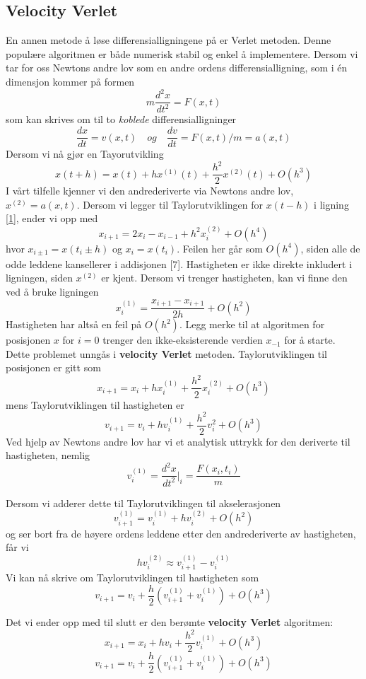 \documentclass[11pt,a4paper]{article}
\begin{document}
\subsection{Velocity Verlet}
En annen metode å løse differensialligningene på er Verlet metoden. Denne populære algoritmen er både numerisk stabil og enkel å implementere. Dersom vi tar for oss Newtons andre lov som en andre ordens differensialligning, som i én dimensjon kommer på formen
\[ m \frac{d^2x}{dt^2} = F(x,t) \]
som kan skrives om til to \textit{koblede} differensialligninger
\[\frac{dx}{dt} = v(x,t) \quad og \quad \frac{dv}{dt} = F(x,t)/m = a(x,t) \]
Dersom vi nå gjør en Tayorutvikling
\begin{equation}
x(t+h) = x(t) + hx^{(1)}(t) + \frac{h^2}{2}x^{(2)}(t) + O(h^3)
\label{1}
\end{equation}
I vårt tilfelle kjenner vi den andrederiverte via Newtons andre lov, $x^{(2)} = a(x,t)$. Dersom vi legger til Taylorutviklingen for $x(t-h)$ i ligning \ref{1}, ender vi opp med 
\[x_{i+1} = 2x_i - x_{i-1} + h^2x_i^{(2)} + O(h^4) \]
hvor $x_{i\pm 1} = x(t_i \pm h)$ og $x_i = x(t_i)$. Feilen her går som $O(h^4)$, siden alle de odde leddene kansellerer i addisjonen [7]. Hastigheten er ikke direkte inkludert i ligningen, siden $x^{(2)}$ er kjent. Dersom vi trenger hastigheten, kan vi finne den ved å bruke ligningen
\[x_i^{(1)} = \frac{x_{i+1} - x_{i+1}}{2h} + O(h^2) \]
Hastigheten har altså en feil på $O(h^2)$. Legg merke til at algoritmen for posisjonen $x$ for $i=0$ trenger den ikke-eksisterende verdien $x_{-1}$ for å starte. Dette problemet unngås i \textbf{velocity Verlet} metoden. Taylorutviklingen til posisjonen er gitt som
\[x_{i+1} = x_i + hx_i^{(1)} + \frac{h^2}{2}x_i^{(2)} + O(h^3) \]
mens Taylorutviklingen til hastigheten er 
\[v_{i+1} = v_i + hv_i^{(1)} + \frac{h^2}{2}v_i^{2} + O(h^3) \]
Ved hjelp av Newtons andre lov har vi et analytisk uttrykk for den deriverte til hastigheten, nemlig
\[ v_i^{(1)} = \frac{d^2x}{dt^2}|_i = \frac{F(x_i, t_i)}{m} \]

Dersom vi adderer dette til Taylorutviklingen til akselerasjonen
\[v_{i+1}^{(1)} = v_i^{(1)} + hv_i^{(2)} + O(h^2) \]
og ser bort fra de høyere ordens leddene etter den andrederiverte av hastigheten, får vi 
\[hv_i^{(2)} \approx v_{i+1}^{(1)} - v_i^{(1)}  \]
Vi kan nå skrive om Taylorutviklingen til hastigheten som
\[ v_{i+1} = v_i + \frac{h}{2}\left( v_{i+1}^{(1)} + v_i^{(1)} \right) + O(h^3)  \]

Det vi ender opp med til slutt er den berømte \textbf{velocity Verlet} algoritmen:
\[x_{i+1} = x_i + hv_i + \frac{h^2}{2}v_i^{(1)} + O(h^3)  \]
\[v_{i+1} = v_i + \frac{h}{2} \left( v_{i+1}^{(1)} + v_i^{(1)} \right) + O(h^3)  \]
\end{document}
